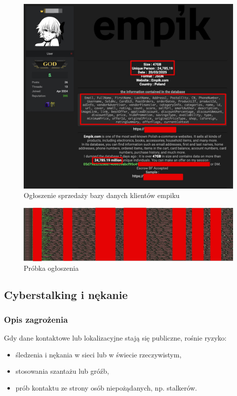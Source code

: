 \begin{figure}
  \centering
  \includegraphics[width=1\textwidth]{images/empik-wyciek.jpg}
  \caption{Ogłoszenie sprzedaży bazy danych klientów empiku}
  \label{fig:empik}
\end{figure} 

\begin{figure}
  \centering
  \includegraphics[width=1\textwidth]{images/probka.jpg}
  \caption{Próbka ogłoszenia}
  \label{fig:probka}
\end{figure} 

\subsection{Cyberstalking i nękanie}
\subsubsection{Opis zagrożenia}
Gdy dane kontaktowe lub lokalizacyjne stają się publiczne, rośnie ryzyko:
\begin{itemize}
\item śledzenia i nękania w sieci lub w świecie rzeczywistym,
\item stosowania szantażu lub gróźb,
\item prób kontaktu ze strony osób niepożądanych, np. stalkerów.
\end{itemize}
